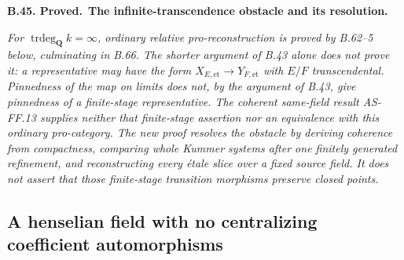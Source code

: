 \documentclass[11pt,a4paper]{article}
\newcommand{\Q}{\mathbf Q}
\newenvironment{claim}[3]{\par\medskip\noindent\hypertarget{#1}{\textbf{#1. #2.}}\ \textbf{#3.}\par\nopagebreak\smallskip\begingroup\itshape}{\endgroup\par\smallskip}
\begin{document}
\begin{claim}{B.45}{Proved}{The infinite-transcendence obstacle and its resolution}
For \(\operatorname{trdeg}_{\Q}k=\infty\), ordinary relative
pro-reconstruction is proved by B.62--5 below, culminating in
B.66. The shorter argument of B.43 alone does not prove it:
a representative may have the form
\(X_{E,\mathrm{et}}\to Y_{F,\mathrm{et}}\) with \(E/F\)
transcendental. Pinnedness of the map on limits does not, by the
argument of B.43, give pinnedness of a finite-stage representative.
The coherent same-field result AS-FF.13 supplies neither that
finite-stage assertion nor an equivalence with this ordinary
pro-category. The new proof resolves the obstacle by deriving
coherence from compactness, comparing whole Kummer systems after
one finitely generated refinement, and reconstructing every étale
slice over a fixed source field. It does not assert that those
finite-stage transition morphisms preserve closed points.
\end{claim}

\subsection{A henselian field with no centralizing coefficient automorphisms}
\end{document}
